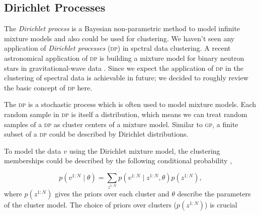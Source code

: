 \documentclass{ar-1col}
\begin{document}
\subsection{Dirichlet Processes}

The \textit{Dirichlet process} \citep{Teh2006} is a Bayesian non-parametric method to model infinite mixture models and also could be used for clustering. We haven't seen any application of \textit{Dirichlet processes} (\textsc{dp}) in spctral data clustering. 
A recent astronomical application of \textsc{dp} is building a mixture model for binary neutron stars in gravitational-wave data \citep{Pozzo2018}. 
Since we expect the application of \textsc{dp} in the clustering of spectral data is achievable in future; we decided to roughly review the basic concept of \textsc{dp} here.

The \textsc{dp} is a stochastic process which is often used to model mixture models. 
Each random sample in \textsc{dp} is itself a distribution, which means we can treat random samples of a \textsc{dp} as cluster centers of a mixture model. 
Similar to \textsc{gp}, a finite subset of a \textsc{dp} could be described by Dirichlet distributions.

To model the data $v$ using the Dirichlet mixture model,
the clustering memberships could be described by the following conditional probability \citep{Barber2012}, 

\begin{equation}
    p(v^{1:N} \mid \theta) = \sum_{z^{1:N}} p(v^{1:N} \mid z^{1:N}, \theta) p(z^{1:N}),
    \label{eq:indicator}
\end{equation}
where $p(z^{1:N})$ gives the priors over each cluster and $\theta$ describe the parameters of the cluster model. 
The choice of priors over clusters ($p(z^{1:N})$) is crucial
\end{document}
